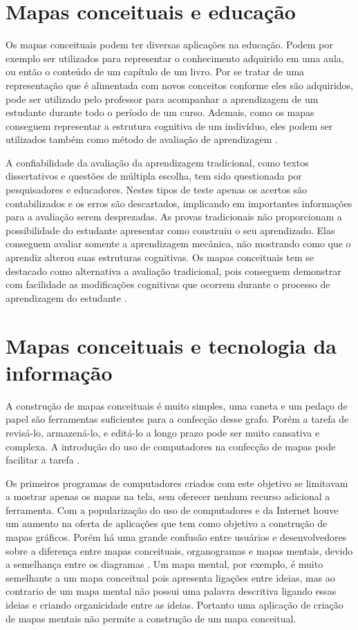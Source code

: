 \documentclass[
	12pt,				%
	openright,			%
	oneside,			%
	a4paper,			%
	english,			%
	french,				%
	spanish,			%
	brazil				%
	]{abntex2}
\begin{document}
\section{Mapas conceituais e educação}\label{sec-mapeduc}

Os mapas conceituais podem ter diversas aplicações na educação. Podem por exemplo ser utilizados para representar o conhecimento adquirido em uma aula, ou então o conteúdo de um capítulo de um livro. Por se tratar de uma representação que é alimentada com novos conceitos conforme eles são adquiridos, pode ser utilizado pelo professor para acompanhar a aprendizagem de um estudante durante todo o período de um curso. Ademais, como os mapas conseguem representar a estrutura cognitiva de um indivíduo, eles podem ser utilizados também como método de avaliação de aprendizagem \cite{Perin2014}.

A confiabilidade da avaliação da aprendizagem tradicional, como textos dissertativos e questões de múltipla escolha, tem sido questionada por pesquisadores e educadores. Nestes tipos de teste apenas os acertos são contabilizados e os erros são descartados, implicando em importantes informações para a avaliação serem desprezadas.
As provas tradicionais não proporcionam a possibilidade do estudante apresentar como construiu o seu aprendizado. Elas conseguem avaliar somente a aprendizagem mecânica, não mostrando como que o aprendiz alterou suas estruturas cognitivas.
Os mapas conceituais tem se destacado como alternativa a avaliação tradicional, pois conseguem demonstrar com facilidade as modificações cognitivas que ocorrem durante o processo de aprendizagem do estudante \cite{Dutra2002}.

\section{Mapas conceituais e tecnologia da informação}

A construção de mapas conceituais é muito simples, uma caneta e um pedaço de papel são ferramentas suficientes para a confecção desse grafo. Porém a tarefa de revisá-lo, armazená-lo, e editá-lo a longo prazo  pode ser muito cansativa e complexa. A introdução do uso de computadores na confecção de mapas pode facilitar a tarefa \cite{Novak2006}.

Os primeiros programas de computadores criados com este objetivo se limitavam a mostrar apenas os mapas na tela, sem oferecer nenhum recurso adicional a ferramenta. Com a popularização do uso de computadores e da Internet houve um aumento na oferta de aplicações que tem como objetivo a construção de mapas gráficos. Porém há uma grande confusão entre usuários e desenvolvedores sobre a diferença entre mapas conceituais, organogramas e mapas mentais, devido a semelhança entre os diagramas \cite{Perin2014}. Um mapa mental, por exemplo, é muito semelhante a um mapa conceitual pois apresenta ligações entre ideias, mas ao contrario de um mapa mental não possui uma palavra descritiva ligando essas ideias e criando organicidade entre as ideias. Portanto uma aplicação de criação de mapas mentais não permite a construção de um mapa conceitual. 
\end{document}
